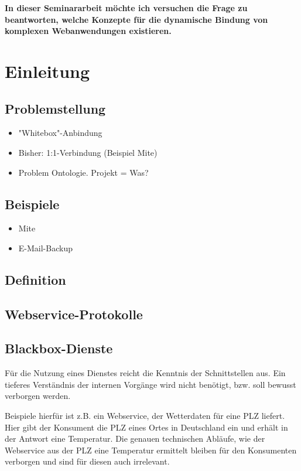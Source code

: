 \documentclass[10pt,a4paper]{article}
\begin{document}
\textbf{In dieser Seminararbeit möchte ich versuchen die Frage zu beantworten, welche Konzepte für die dynamische Bindung von komplexen Webanwendungen existieren.}

\pagebreak

\tableofcontents

\pagebreak

\section{Einleitung}

\subsection{Problemstellung}
\begin{itemize}
\item "Whitebox"-Anbindung
\item Bisher: 1:1-Verbindung (Beispiel Mite)
\item Problem Ontologie. Projekt = Was?
\end{itemize}
\subsection{Beispiele}
\begin{itemize}
\item Mite
\item E-Mail-Backup
\end{itemize}
\subsection{Definition}
\subsection{Webservice-Protokolle}
\label{l:wsprot}
\subsection{Blackbox-Dienste}
\label{l:blackbox}
Für die Nutzung eines Dienstes reicht die Kenntnis der Schnittstellen aus. Ein tieferes Verständnis
der internen Vorgänge wird nicht benötigt, bzw. soll bewusst verborgen werden. \cite{hhxmlwssoa}

Beispiele hierfür ist z.B. ein Webservice, der Wetterdaten für eine PLZ liefert. Hier gibt der Konsument die PLZ eines Ortes in Deutschland ein und erhält in der Antwort eine Temperatur. Die genauen technischen Abläufe, wie der Webservice aus der PLZ eine Temperatur ermittelt bleiben für den Konsumenten verborgen und sind für diesen auch irrelevant.
\end{document}
